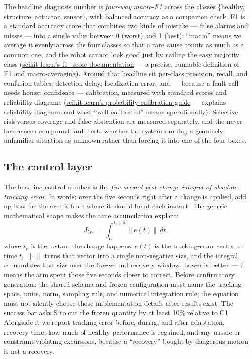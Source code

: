 \documentclass[12pt]{article}
\begin{document}
The headline diagnosis number is \emph{four-way macro-F1} across the classes \{healthy, structure, actuator, sensor\}, with balanced accuracy as a companion check. F1 is a standard accuracy score that combines two kinds of mistake --- false alarms and misses --- into a single value between 0 (worst) and 1 (best); ``macro'' means we average it evenly across the four classes so that a rare cause counts as much as a common one, and the robot cannot look good just by nailing the easy majority class (\href{https://scikit-learn.org/stable/modules/generated/sklearn.metrics.f1_score.html}{scikit-learn's f1\_score documentation} --- a precise, runnable definition of F1 and macro-averaging). Around that headline sit per-class precision, recall, and confusion tables; detection delay; localization error; and --- because a fault call needs honest confidence --- calibration, measured with standard scores and reliability diagrams (\href{https://scikit-learn.org/stable/modules/calibration.html}{scikit-learn's probability-calibration guide} --- explains reliability diagrams and what ``well-calibrated'' means operationally). Selective risk-versus-coverage and false abstention are measured separately, and the never-before-seen compound fault tests whether the system can flag a genuinely unfamiliar situation as unknown rather than forcing it into one of the four boxes.

\subsection{The control layer}

The headline control number is the \emph{five-second post-change integral of absolute tracking error}. In words: over the five seconds right after a change is applied, add up how far the arm is from where it should be at each instant. The generic mathematical shape makes the time accumulation explicit:
\[
J_{5\text{s}} \;=\; \int_{t_c}^{\,t_c + 5} \bigl\lVert e(t) \bigr\rVert \, dt,
\]
where $t_c$ is the instant the change happens, $e(t)$ is the tracking-error vector at time $t$, $\lVert \cdot \rVert$ turns that vector into a single non-negative size, and the integral accumulates that size over the five-second recovery window. Lower is better --- it means the arm spent those five seconds closer to correct. Before confirmatory generation, the shared schema and frozen configuration must name the tracking space, units, norm, sampling rule, and numerical integration rule; the equation must not silently choose those implementation details after results exist. The success bar asks S to cut the frozen quantity by at least 10\% relative to C1. Alongside it we report tracking error before, during, and after adaptation, recovery time, how much of healthy performance is regained, and any unsafe or constraint-violating excursions, because a ``recovery'' bought by dangerous motion is not a recovery.
\end{document}
